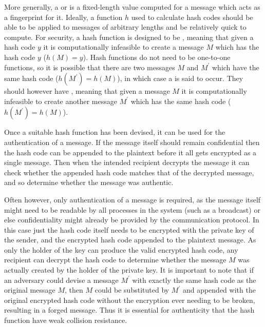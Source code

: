 More generally, a  or  is a fixed-length
value computed for a message which acts as a fingerprint for it.
Ideally, a function $h$ used to calculate hash codes should be able to be applied
to messages of arbitrary lengths and be relatively quick to compute.
For security, a hash function is designed to be , meaning
that given a hash code $y$ it is computationally infeasible to create a message
$M$ which has the hash code $y$ ($h(M)=y$).
Hash functions do not need to be one-to-one functions, so it is possible that there are
two messages $M$ and $M^\prime$ which have the same hash code ($h(M^\prime)=h(M)$),
in which case a  is said to occur.
They should however have , meaning that
given a message $M$ it is computationally infeasible to create another message
$M^\prime$ which has the same hash code ($h(M^\prime)=h(M)$).

Once a suitable hash function has been devised, it can be used for the
authentication of a message.
If the message itself should remain confidential then the hash code
can be appended to the plaintext before it all gets encrypted as a single message.
Then when the intended recipient decrypts the message it can check whether the appended
hash code matches that of the decrypted message, and so determine whether the message
was authentic.

Often however, only authentication of a message is required, as the message
itself might need to be readable by all processes in the system (such as a
broadcast) or else confidentiality might
already be provided by the communication protocol.
In this case just the hash code itself needs to be encrypted with the private key
of the sender, and the encrypted hash code appended to the plaintext message.
As only the holder of the key can produce the valid encrypted hash code,
any recipient can decrypt the hash code to determine whether the
message $M$ was actually created by the holder of the private key.
It is important to note that if an adversary could devise a message $M^\prime$
with exactly the same hash code as the original message $M$,
then $M$ could be substituted by $M^\prime$ and appended
with the original encrypted hash code without the encryption ever needing to be broken,
resulting in a forged message.
Thus it is essential for authenticity that the hash function have weak collision resistance.

